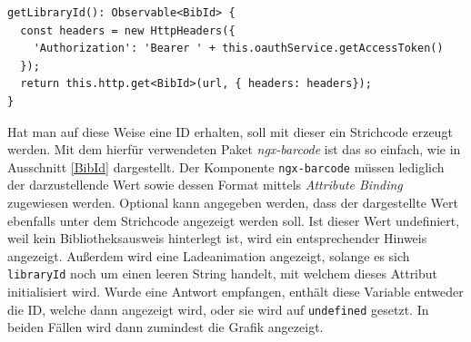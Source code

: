 \begin{lstlisting}[float, floatplacement=h, style=htmlcssjs, caption={Anfrage mit Header am Beispiel des Bibliotheksausweises}, label={BibAuth}]
getLibraryId(): Observable<BibId> {
  const headers = new HttpHeaders({
    'Authorization': 'Bearer ' + this.oauthService.getAccessToken()
  });
  return this.http.get<BibId>(url, { headers: headers});
}
\end{lstlisting}
Hat man auf diese Weise eine ID erhalten, soll mit dieser ein Strichcode erzeugt werden. Mit dem hierfür verwendeten Paket \textit{ngx-barcode} ist das so einfach, wie in Ausschnitt \ref{BibId} dargestellt. Der Komponente \texttt{ngx-barcode} müssen lediglich der darzustellende Wert sowie dessen Format mittels \textit{Attribute Binding} zugewiesen werden. Optional kann angegeben werden, dass der dargestellte Wert ebenfalls unter dem Strichcode  angezeigt werden soll. Ist dieser Wert undefiniert, weil kein Bibliotheksausweis hinterlegt ist, wird ein entsprechender Hinweis angezeigt. Außerdem wird eine Ladeanimation angezeigt, solange es sich \texttt{libraryId} noch um einen leeren String handelt, mit welchem dieses Attribut initialisiert wird. Wurde eine Antwort empfangen, enthält diese Variable entweder die ID, welche dann angezeigt wird, oder sie wird auf \texttt{undefined} gesetzt. In beiden Fällen wird dann zumindest die Grafik angezeigt.

